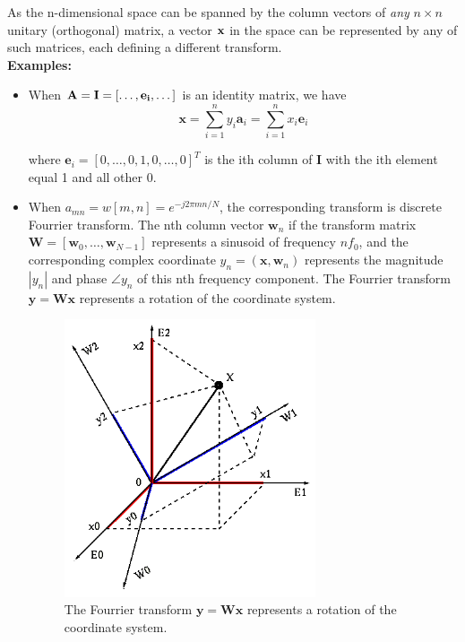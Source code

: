 \documentclass[10pt,b5paper,titlepage]{book}
\begin{document}
As the n-dimensional space can be spanned by the column vectors of \textit{any} $n \times n$ unitary (orthogonal) matrix, a vector  $\bf{x}$ in the space can be represented by any of such matrices, each defining a different transform.\\

\textbf{Examples:}
\begin{itemize}
    \item When $\bf{A} = \mathbf{I} = [\dots, \mathbf{e}_i, \dots]$ is an identity matrix, we have
        \begin{equation}
            \mathbf{x} = \sum_{i=1}^{n} y_i \mathbf{a}_i = \sum_{i=1}^{n} x_i \mathbf{e}_i
        \end{equation}

        where $\mathbf{e}_i = [0, \dots, 0, 1, 0, \dots, 0]^{T}$ is the ith column of  $\mathbf{I}$ with the ith element equal 1 and all other 0.

    \item When $a_{mn} = w[m,n] = e^{-j 2 \pi m n / N}$, the corresponding
        transform is discrete Fourrier transform. The nth column vector
        $\mathbf{w}_n$ if the transform matrix
        $\mathbf{W} = [\mathbf{w}_0, \dots, \mathbf{w}_{N-1}]$
        represents a sinusoid of frequency  $n f_0$,
        and the corresponding complex coordinate
        $y_n = (\mathbf{x}, \mathbf{w}_n)$ represents the magnitude
        $|y_n|$ and phase $\angle y_n$
        of this nth frequency component. The Fourrier transform
        $\mathbf{y} = \mathbf{W} \mathbf{x}$ represents a rotation of the coordinate
        system.\\

        \begin{figure}[htpb]
            \centering
            \includegraphics[width=0.7\textwidth]{./img/unitary_transform_2}
            \caption{The Fourrier transform $\mathbf{y} = \mathbf{W} \mathbf{x}$ represents a rotation of the coordinate system.}
            \label{fig:unitary_transform_2}
        \end{figure}


\end{itemize}
\end{document}
